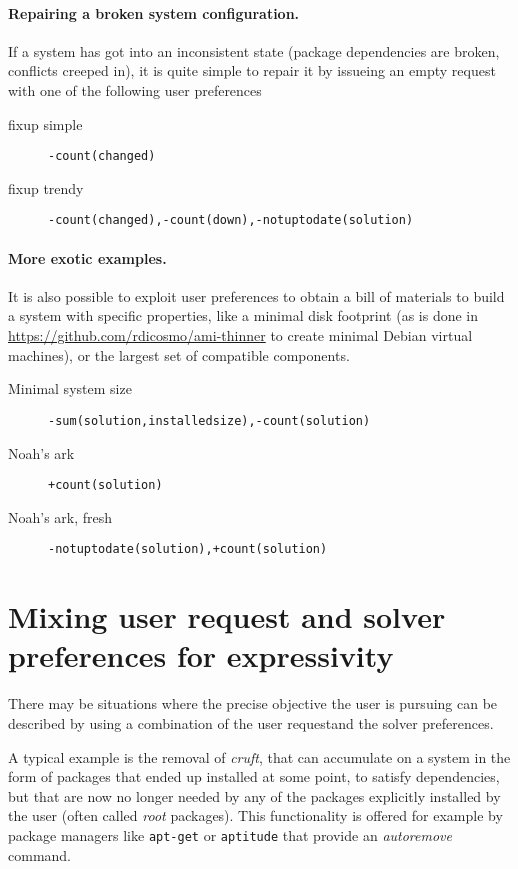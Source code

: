 \documentclass{article}
\newcommand{\solverpref}[1]{{\texttt{#1}}}
\begin{document}
\paragraph{Repairing a broken system configuration.} If a system has got into an inconsistent state (package dependencies are broken, conflicts creeped in), it
is quite simple to repair it by issueing an empty request with one of the following user preferences
\begin{description}
\item[fixup simple] \solverpref{-count(changed)}
\item[fixup trendy] \solverpref{-count(changed),-count(down),-notuptodate(solution)}
\end{description}

\paragraph{More exotic examples.} It is also possible to exploit user preferences to obtain a bill of materials to build a system with
specific properties, like a minimal disk footprint (as is done in \url{https://github.com/rdicosmo/ami-thinner} to create minimal Debian
virtual machines), or the largest set of compatible components.

\begin{description}
\item[Minimal system size] \solverpref{-sum(solution,installedsize),-count(solution)}
\item[Noah's ark] \solverpref{+count(solution)}
\item[Noah's ark, fresh] \solverpref{-notuptodate(solution),+count(solution)}
\end{description}

\section{Mixing user request and solver preferences for expressivity}

There may be situations where the precise objective the user is pursuing can be
described by using a combination of the user requestand the solver preferences.

A typical example is the removal of \emph{cruft}, that can accumulate on a
system in the form of packages that ended up installed at some point, to satisfy
dependencies, but that are now no longer needed by any of the packages
explicitly installed by the user (often called \emph{root} packages).  This
functionality is offered for example by package managers like \texttt{apt-get}
or \texttt{aptitude} that provide an \emph{autoremove} command.\\
\end{document}
